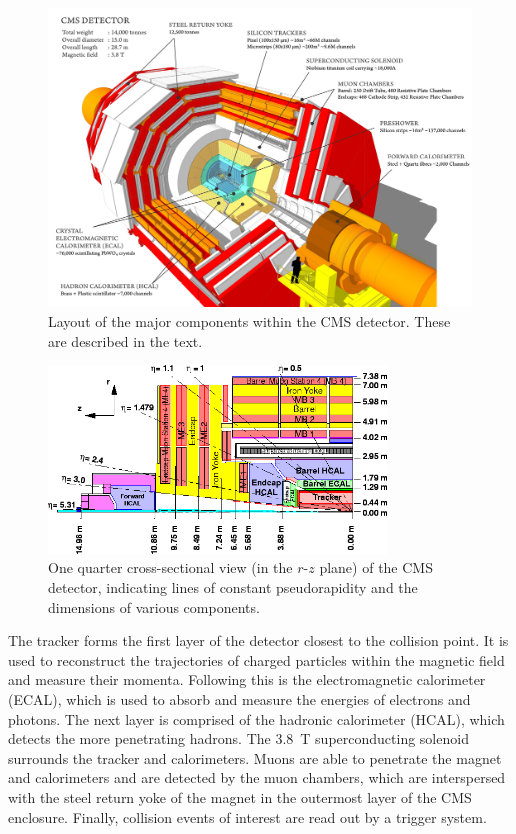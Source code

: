 \begin{figure}
\centering
\includegraphics[width=1\textwidth]{figs/detector/cms3d}
\caption{Layout of the major components within the CMS detector. These are 
described in the text.}
\label{fig:cms3d}
\end{figure}
\begin{figure}
\centering
\includegraphics[width=0.8\textwidth]{figs/detector/cms2d.png}
\caption{One quarter cross-sectional view (in the $r$-$z$ plane) of the CMS 
detector, indicating lines of constant pseudorapidity and the dimensions of 
various components.}
\label{fig:cms2d}
\end{figure}

The tracker forms the first layer of the detector closest to the collision 
point. It is used to reconstruct the trajectories of charged particles within 
the magnetic field and measure their momenta. Following this is the 
electromagnetic calorimeter (ECAL), which is used to absorb and measure the 
energies of electrons and photons. The next layer is comprised of the hadronic 
calorimeter (HCAL), which detects the more penetrating hadrons. The 3.8~T 
superconducting solenoid surrounds the tracker and calorimeters. Muons are able 
to penetrate the magnet and calorimeters and are detected by the muon chambers, 
which are interspersed with the steel return yoke of the magnet in the 
outermost layer of the CMS enclosure.
Finally, collision events of interest are read out by a trigger system.

